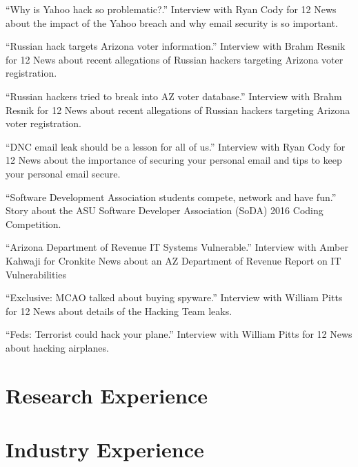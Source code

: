 \documentclass[11pt,letterpaper,sans]{moderncv}
\begin{document}
 {``Why is Yahoo hack so problematic?.'' Interview with Ryan Cody for 12 News about the impact of the Yahoo breach and why email security is so important.}

 {``Russian hack targets Arizona voter
  information.'' Interview with Brahm Resnik for 12 News about recent allegations of Russian hackers targeting Arizona voter registration.}

 {``Russian hackers tried to break into AZ
  voter database.'' Interview with Brahm Resnik for 12 News about recent allegations of Russian hackers targeting Arizona voter registration.}

 {``DNC email leak should be a lesson for all
  of us.'' Interview with Ryan Cody for 12 News about the importance of securing your personal email and tips to keep your personal email secure.}

 {``Software Development Association students
  compete, network and have fun.'' Story about the ASU Software Developer Association (SoDA) 2016 Coding Competition.}

 {``Arizona Department of Revenue IT Systems
  Vulnerable.'' Interview with Amber Kahwaji for Cronkite News about an AZ Department of Revenue Report on IT Vulnerabilities}

 {``Exclusive: MCAO talked about buying
  spyware.'' Interview with William Pitts for 12 News about details of the Hacking Team leaks.}

 {``Feds: Terrorist could hack your plane.'' Interview with William Pitts for 12 News about hacking airplanes.}



\section{Research Experience}



\section{Industry Experience}
\end{document}
